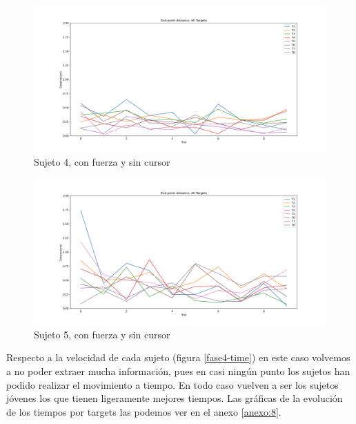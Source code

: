 \documentclass[a4paper,11pt, oneside]{book}
\begin{document}
\begin{figure}[H]
	\includegraphics[width=\linewidth]{sujeto4/force_no_cursor/evolution_distance}
	\caption{Sujeto 4, con  fuerza y sin cursor}
	\label{4-4-2}
\end{figure}
\begin{figure}[H]
	\includegraphics[width=\linewidth]{sujeto5/force_no_cursor/evolution_distance}
	\caption{Sujeto 5, con  fuerza y sin cursor}
	\label{5-4-2}
\end{figure}


Respecto a la velocidad de cada sujeto (figura \ref{fase4-time}) en este caso volvemos a no poder extraer mucha información, pues en casi ningún punto los sujetos han podido realizar el movimiento a tiempo. En todo caso vuelven a ser los sujetos jóvenes los que tienen ligeramente mejores tiempos. Las gráficas de la evolución de los tiempos por targets las podemos ver en el anexo \ref{anexo:8}.
\end{document}
